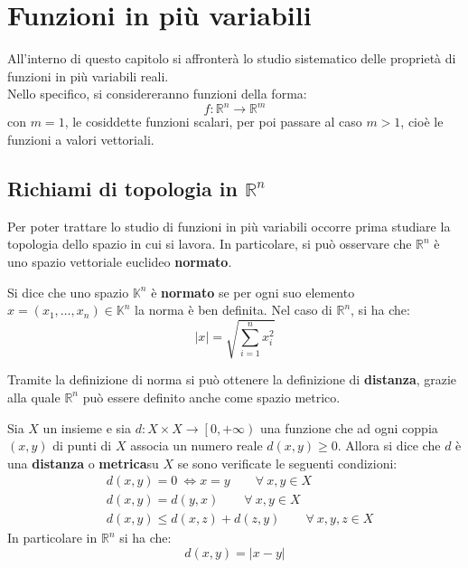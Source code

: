 \chapter{Funzioni in più variabili}
All'interno di questo capitolo si affronterà lo studio sistematico delle proprietà di funzioni in più variabili reali.\\
Nello specifico, si considereranno funzioni della forma: 
\begin{equation}
    f:\mathbb{R}^n \to \mathbb{R}^m
\end{equation}
con $m=1$, le cosiddette funzioni scalari, per poi passare al caso $m>1$, cioè le funzioni a valori vettoriali.
\section{Richiami di topologia in $\mathbb{R}^n$}
Per poter trattare lo studio di funzioni in più variabili occorre prima studiare la topologia dello spazio in cui si lavora.
In particolare, si può osservare che $\mathbb{R}^n$ è uno spazio vettoriale euclideo \textbf{normato}.
\begin{definition}
    Si dice che uno spazio $\mathbb{K}^n$ è \textbf{normato} se per ogni suo elemento $x=(x_1,\dots,x_n) \in \mathbb{K}^n$ la norma è ben definita. Nel caso di $\mathbb{R}^n$, si ha che:
    \begin{equation}
        |x|=\sqrt{\sum\limits_{i=1}^{n}{x_i^2}}
    \end{equation}
\end{definition}
Tramite la definizione di norma si può ottenere la definizione di \textbf{distanza}, grazie alla quale $\mathbb{R}^n$ può essere definito anche come spazio metrico.
\begin{definition} \label{Def: Distanza}
    Sia $X$ un insieme e sia $d:X \times X \to \left[0, +\infty \right)$ una funzione che ad ogni coppia $(x,y)$ di punti di $X$ associa un numero reale $d(x,y)\geq0$. Allora si dice che $d$ è una \textbf{distanza} o \textbf{metrica}su $X$ se sono verificate le seguenti condizioni:
    \begin{align}
        &d(x,y)=0 \ \iff x=y \qquad\forall\ x,y \in X \\
        &d(x,y)=d(y,x) \qquad \forall\ x,y \in X \\
        &d(x,y) \leq d(x,z) + d(z, y) \qquad \forall\ x,y,z \in X
    \end{align}
    In particolare in $\mathbb{R}^n$ si ha che:
    \begin{equation}
        d(x, y)=|x-y|
    \end{equation}
\end{definition}
